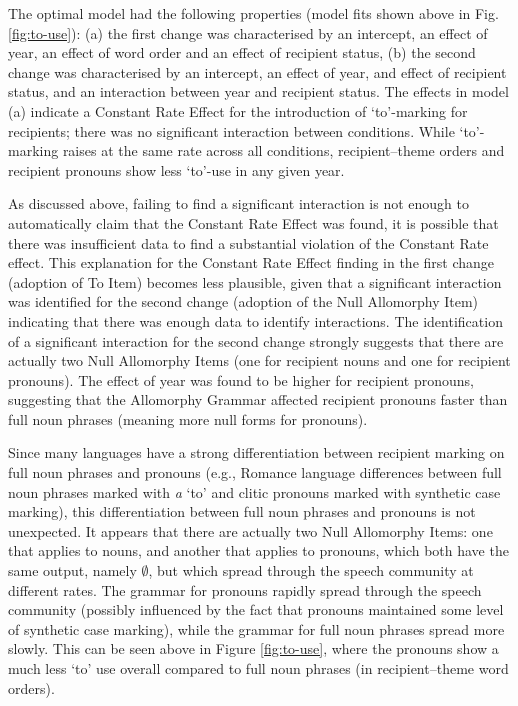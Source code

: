	The optimal model had the following properties (model fits shown above in Fig. \ref{fig:to-use}): (a) the first change was characterised by an intercept, an effect of year, an effect of word order and an effect of recipient status, (b) the second change was characterised by an intercept, an effect of year, and effect of recipient status, and an interaction between year and recipient status. The effects in model (a) indicate a Constant Rate Effect for the introduction of `to'-marking for recipients; there was no significant interaction between conditions. While `to'-marking raises at the same rate across all conditions, recipient--theme orders and recipient pronouns show less `to'-use in any given year. 
	
	As discussed above, failing to find a significant interaction is not enough to automatically claim that the Constant Rate Effect was found, it is possible that there was insufficient data to find a substantial violation of the Constant Rate effect. This explanation for the Constant Rate Effect finding in the first change (adoption of To Item) becomes less plausible, given that a significant interaction was identified for the second change (adoption of the Null Allomorphy Item) indicating that there was enough data to identify interactions. The identification of a significant interaction for the second change strongly suggests that there are actually two Null Allomorphy Items (one for recipient nouns and one for recipient pronouns). The effect of year was found to be higher for recipient pronouns, suggesting that the Allomorphy Grammar affected recipient pronouns faster than full noun phrases (meaning more null forms for pronouns).
	
	Since many languages have a strong differentiation between recipient marking on full noun phrases and pronouns (e.g., Romance language differences between full noun phrases marked with \textit{a} `to' and clitic pronouns marked with synthetic case marking), this differentiation between full noun phrases and pronouns is not unexpected. It appears that there are actually two Null Allomorphy Items: one that applies to nouns, and another that applies to pronouns, which both have the same output, namely $\emptyset$, but which spread through the speech community at different rates. The grammar for pronouns rapidly spread through the speech community (possibly influenced by the fact that pronouns maintained some level of synthetic case marking), while the grammar for full noun phrases spread more slowly. This can be seen above in Figure \ref{fig:to-use}, where the pronouns show a much less `to' use overall compared to full noun phrases (in recipient--theme word orders).


